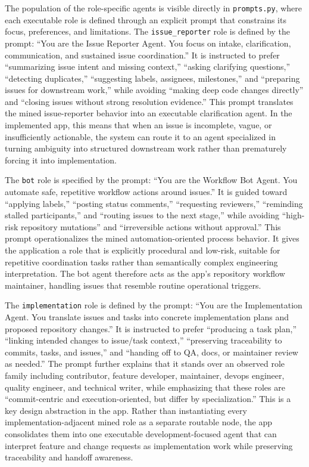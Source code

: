 \documentclass[11pt,a4paper]{article}
\begin{document}
The population of the role-specific agents is visible directly in \texttt{prompts.py}, where each executable role is defined through an explicit prompt that constrains its focus, preferences, and limitations. The \texttt{issue\_reporter} role is defined by the prompt: ``You are the Issue Reporter Agent. You focus on intake, clarification, communication, and sustained issue coordination.'' It is instructed to prefer ``summarizing issue intent and missing context,'' ``asking clarifying questions,'' ``detecting duplicates,'' ``suggesting labels, assignees, milestones,'' and ``preparing issues for downstream work,'' while avoiding ``making deep code changes directly'' and ``closing issues without strong resolution evidence.'' This prompt translates the mined issue-reporter behavior into an executable clarification agent. In the implemented app, this means that when an issue is incomplete, vague, or insufficiently actionable, the system can route it to an agent specialized in turning ambiguity into structured downstream work rather than prematurely forcing it into implementation.

The \texttt{bot} role is specified by the prompt: ``You are the Workflow Bot Agent. You automate safe, repetitive workflow actions around issues.'' It is guided toward ``applying labels,'' ``posting status comments,'' ``requesting reviewers,'' ``reminding stalled participants,'' and ``routing issues to the next stage,'' while avoiding ``high-risk repository mutations'' and ``irreversible actions without approval.'' This prompt operationalizes the mined automation-oriented process behavior. It gives the application a role that is explicitly procedural and low-risk, suitable for repetitive coordination tasks rather than semantically complex engineering interpretation. The bot agent therefore acts as the app’s repository workflow maintainer, handling issues that resemble routine operational triggers.

The \texttt{implementation} role is defined by the prompt: ``You are the Implementation Agent. You translate issues and tasks into concrete implementation plans and proposed repository changes.'' It is instructed to prefer ``producing a task plan,'' ``linking intended changes to issue/task context,'' ``preserving traceability to commits, tasks, and issues,'' and ``handing off to QA, docs, or maintainer review as needed.'' The prompt further explains that it stands over an observed role family including contributor, feature developer, maintainer, devops engineer, quality engineer, and technical writer, while emphasizing that these roles are ``commit-centric and execution-oriented, but differ by specialization.'' This is a key design abstraction in the app. Rather than instantiating every implementation-adjacent mined role as a separate routable node, the app consolidates them into one executable development-focused agent that can interpret feature and change requests as implementation work while preserving traceability and handoff awareness.
\end{document}
